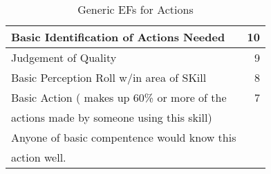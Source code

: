 \begin{table}[hb]
\centering
\caption{Generic EFs for Actions}
	\begin{tabular}{||l|r||}	\hline
	Basic Identification of Actions Needed		  & 10	\\ \hline
	Judgement of Quality                          & 9	\\ \hline
	Basic Perception Roll w/in area of SKill      & 8	\\ \hline
	Basic Action ( makes up 60\% or more of the   & 7	\\  
	actions made by someone using this skill)     &      \\
	Anyone of basic compentence would know this   &      \\
	action well.                                  &      \\ \hline 
	\end{tabular}
\end{table}
